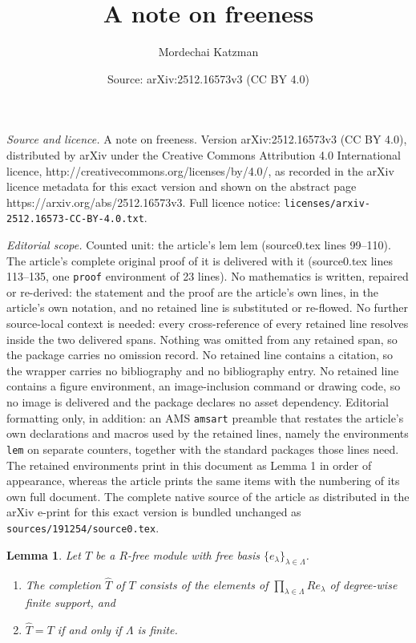 \documentclass[10pt,a4paper]{amsart}
\title{A note on freeness}
\author{Mordechai Katzman}
\date{Source: arXiv:2512.16573v3 (CC BY 4.0)}
\newtheorem{lem}{Lemma}
\begin{document}
\maketitle

\noindent\emph{Source and licence.} A note on freeness. Version arXiv:2512.16573v3 (CC BY 4.0), distributed by arXiv under the Creative Commons Attribution 4.0 International licence, http://creativecommons.org/licenses/by/4.0/, as recorded in the arXiv licence metadata for this exact version and shown on the abstract page https://arxiv.org/abs/2512.16573v3. Full licence notice: \texttt{licenses/arxiv-2512.16573-CC-BY-4.0.txt}.\par\smallskip

\noindent\textit{Editorial scope.} Counted unit: the article's lem lem (source0.tex lines 99--110). The article's complete original proof of it is delivered with it (source0.tex lines 113--135, one \texttt{proof} environment of 23 lines). No mathematics is written, repaired or re-derived: the statement and the proof are the article's own lines, in the article's own notation, and no retained line is substituted or re-flowed.  No further source-local context is needed: every cross-reference of every retained line resolves inside the two delivered spans.  Nothing was omitted from any retained span, so the package carries no omission record.  No retained line contains a citation, so the wrapper carries no bibliography and no bibliography entry.  No retained line contains a figure environment, an image-inclusion command or drawing code, so no image is delivered and the package declares no asset dependency.  Editorial formatting only, in addition: an AMS \texttt{amsart} preamble that restates the article's own declarations and macros used by the retained lines, namely the environments \texttt{lem} on separate counters, together with the standard packages those lines need.  The retained environments print in this document as Lemma 1 in order of appearance, whereas the article prints the same items with the numbering of its own full document.  The complete native source of the article as distributed in the arXiv e-print for this exact version is bundled unchanged as \texttt{sources/191254/source0.tex}.
\begin{lem}
Let $T$ be a $R$-free module with free basis
$\{ e_\lambda \}_{\lambda\in \Lambda}$.
\begin{enumerate}

\item[(a)] The completion $\widehat{T}$ of $T$ consists of
the elements of $\prod_{\lambda\in\Lambda} R e_\lambda$
of degree-wise finite support, and

\item[(b)] $\widehat{T}=T$ if and only if $\Lambda$ is finite.
\end{enumerate}
\end{lem}
\end{document}
